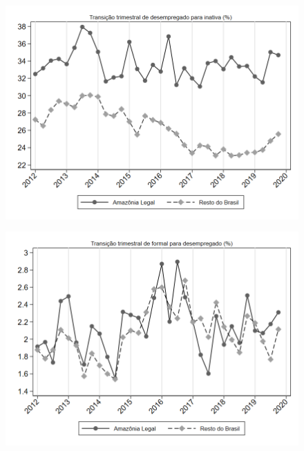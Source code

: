 \begin{frame}[label=_transicao_ocupacao_sh_desempregado_sh_inativa]{}
\textit{\hyperlink{_transicao_ocupacao}{}}
\begin{figure}
  \centering
  \includegraphics[width=1.0\linewidth]{../../analysis/output/transicao_ocupacao/_transicao_ocupacao_sh_desempregado_sh_inativa.png}
  \caption{}
  \label{fig:_transicao_ocupacao_sh_desempregado_sh_inativa}
\end{figure}
\end{frame}

\begin{frame}[label=_transicao_ocupacao_sh_formal_sh_desempregado]{}
\textit{\hyperlink{_transicao_ocupacao}{}}
\begin{figure}
  \centering
  \includegraphics[width=1.0\linewidth]{../../analysis/output/transicao_ocupacao/_transicao_ocupacao_sh_formal_sh_desempregado.png}
  \caption{}
  \label{fig:_transicao_ocupacao_sh_formal_sh_desempregado}
\end{figure}
\end{frame}


